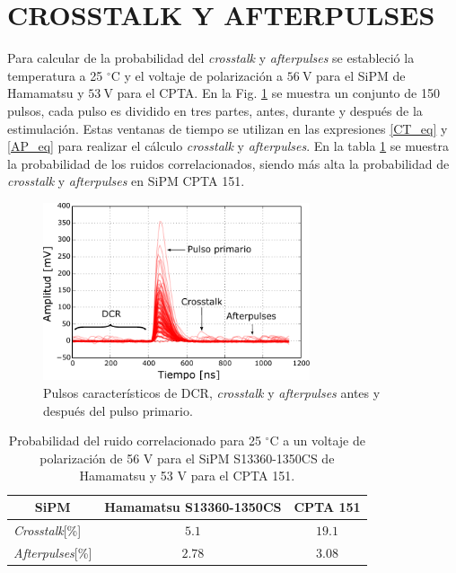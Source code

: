 \section{CROSSTALK Y AFTERPULSES}
Para calcular de la probabilidad del \textit{crosstalk} y  \textit{afterpulses} se estableció la temperatura a 25 $^\circ$C y el voltaje de polarización a  $56~\mbox{V}$ para el SiPM de Hamamatsu y $53~\mbox{V}$ para el CPTA. En la Fig. \ref{fig:NoiseP} se muestra un conjunto de 150 pulsos, cada pulso es dividido en tres partes, antes, durante y después de la estimulación. Estas ventanas de tiempo se utilizan en las expresiones \ref{CT_eq} y \ref{AP_eq} para realizar el cálculo \textit{crosstalk} y  \textit{afterpulses}. En la tabla \ref{AP_CT} se muestra la probabilidad de los ruidos correlacionados, siendo más alta la probabilidad de  \textit{crosstalk} y  \textit{afterpulses} en SiPM CPTA 151.   
\begin{figure}[h!]
\begin{centering}
  \includegraphics[width=0.7\textwidth]{Images/100P_1350CS.pdf}
  \caption{Pulsos característicos de DCR, \textit{crosstalk} y \textit{afterpulses} antes y después del pulso primario.}
  \label{fig:NoiseP}
  \par\end{centering}
\end{figure}
\begin{table}[h!]
\caption{Probabilidad del ruido correlacionado para 25 $^\circ$C a un voltaje de polarización de 56 V para el SiPM S13360-1350CS de Hamamatsu y 53 V para el CPTA 151.}
    \label{AP_CT}
	\centering
	\begin{tabular}{ c  c  c}
    \hline
    SiPM       & Hamamatsu S13360-1350CS  & CPTA 151      \\ \hline
    \multicolumn{1}{l}{\textit{Crosstalk}[\%] }     &   $5.1$      & $ 19.1$ \\
    \multicolumn{1}{l}{\textit{Afterpulses}[\%]}      & $2.78$         & $3.08$ \\
	\end{tabular}	
\end{table}
